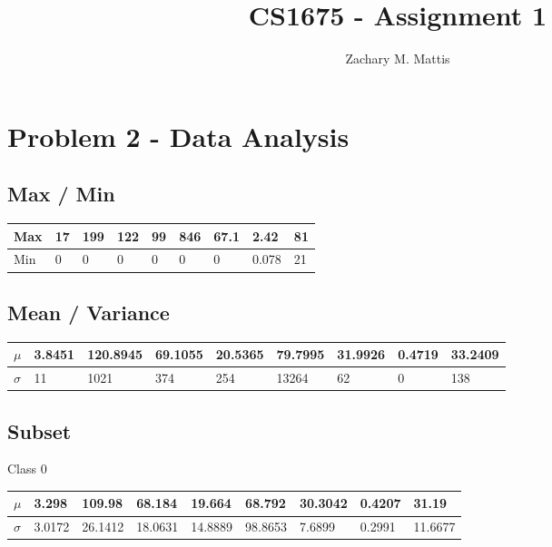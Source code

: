 \documentclass[12pt, letterpaper]{report}
\title{CS1675 - Assignment 1}
\author{Zachary M. Mattis}
\begin{document}
	
\maketitle

\section{Problem 2 - Data Analysis}

\subsection{Max / Min}

\begin{center}
	\begin{tabular}{ |l|l|l|l|l|l|l|l|l| } 
		\hline
		Max & 17 & 199 & 122 & 99 & 846 & 67.1 & 2.42 & 81 \\
		\hline
		Min & 0 & 0 & 0 & 0 & 0 & 0 & 0.078 & 21 \\
		\hline
	\end{tabular}
\end{center}

\subsection{Mean / Variance}

\begin{center}
	\begin{tabular}{ |l|l|l|l|l|l|l|l|l| } 
		\hline
		$\mu$ & 3.8451 & 120.8945 & 69.1055 & 20.5365 & 79.7995 & 31.9926 & 0.4719 & 33.2409 \\
		\hline
		$\sigma$ & 11 & 1021 & 374 & 254 & 13264 & 62 & 0 & 138 \\
		\hline
	\end{tabular}
\end{center}

\subsection{Subset}

Class 0

\begin{center}
	\begin{tabular}{ |l|l|l|l|l|l|l|l|l| } 
		\hline
		$\mu$ & 3.298 & 109.98 & 68.184 & 19.664 & 68.792 & 30.3042 & 0.4207 & 31.19 \\
		\hline
		$\sigma$ & 3.0172 & 26.1412 & 18.0631 & 14.8889 & 98.8653 & 7.6899 & 0.2991 & 11.6677 \\
		\hline
	\end{tabular}
\end{center}
\end{document}
